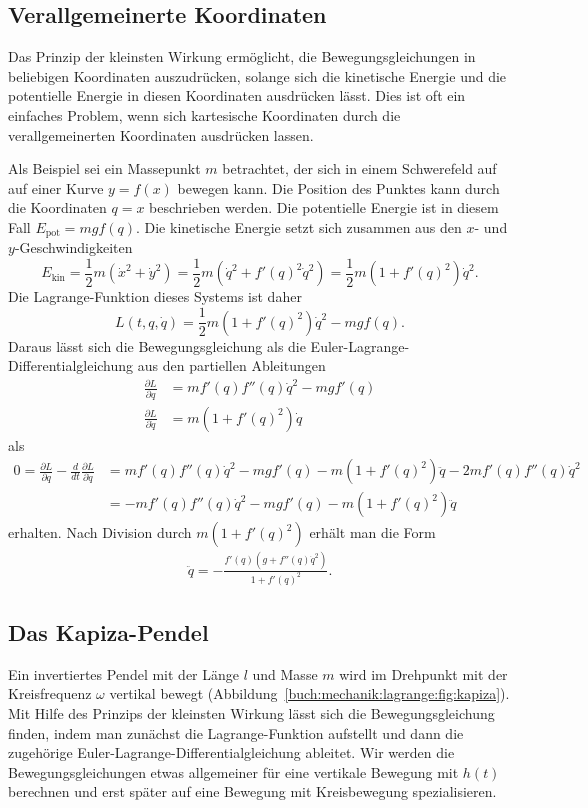 %
%
\subsection{Verallgemeinerte Koordinaten
\label{buch:mechanik:lagrange:subsection:koordinaten}}
Das Prinzip der kleinsten Wirkung ermöglicht, die Bewegungsgleichungen
in beliebigen Koordinaten auszudrücken, solange sich die kinetische
Energie und die potentielle Energie in diesen Koordinaten ausdrücken
lässt.
Dies ist oft ein einfaches Problem, wenn sich kartesische Koordinaten
durch die verallgemeinerten Koordinaten ausdrücken lassen.

Als Beispiel sei ein Massepunkt $m$ betrachtet, der sich in einem
Schwerefeld auf auf einer Kurve $y=f(x)$ bewegen kann.
Die Position des Punktes kann durch die Koordinaten $q=x$ beschrieben
werden.
Die potentielle Energie ist in diesem Fall $E_{\text{pot}} = mgf(q)$.
Die kinetische Energie setzt sich zusammen aus den $x$- und
$y$-Geschwindigkeiten
\[
E_{\text{kin}}
=
\frac12m(\dot{x}^2 + \dot{y}^2)
=
\frac12m(\dot{q}^2 + f'(q)^2 \dot{q}^2)
=
\frac12m(1+f'(q)^2)\dot{q}^2.
\]
Die Lagrange-Funktion dieses Systems ist daher 
\[
L(t,q,\dot{q})
=
\frac12m(1+f'(q)^2)\dot{q}^2 - mgf(q).
\]
Daraus lässt sich die Bewegungsgleichung als die
Euler-Lagrange-Differentialgleichung aus den partiellen Ableitungen
\begin{align*}
\frac{\partial L}{\partial q}
&=
mf'(q)f''(q)\dot{q}^2 - mgf'(q)
\\
\frac{\partial L}{\partial\dot{q}}
&=
m(1+f'(q)^2)\dot{q}
\end{align*}
als
\begin{align*}
0
=
\frac{\partial L}{\partial q}-\frac{d}{dt}\frac{\partial L}{\partial\dot{q}}
&=
mf'(q)f''(q)\dot{q}^2
-
mgf'(q)
-
m(1+f'(q)^2)\ddot{q}
-
2mf'(q)f''(q)\dot{q}^2
\\
&=
-
mf'(q)f''(q)\dot{q}^2
-
mgf'(q)
-
m(1+f'(q)^2)\ddot{q}
\end{align*}
erhalten.
Nach Division durch $m(1+f'(q)^2)$ erhält man die Form
\begin{align*}
\ddot{q}
=
-
\frac{f'(q)(g+f''(q)\dot{q}^2)}{1+f'(q)^2}.
\end{align*}


%
%
\subsection{Das Kapiza-Pendel}

Ein invertiertes Pendel mit der Länge $l$ und Masse $m$ wird im
Drehpunkt mit der Kreisfrequenz $\omega$ vertikal bewegt
(Abbildung~\ref{buch:mechanik:lagrange:fig:kapiza}).
Mit Hilfe des Prinzips der kleinsten Wirkung lässt sich die
Bewegungsgleichung finden, indem man zunächst die Lagrange-Funktion
aufstellt und dann die zugehörige Euler-Lagrange-Differentialgleichung
ableitet.
Wir werden die Bewegungsgleichungen etwas allgemeiner für eine
vertikale Bewegung mit $h(t)$ berechnen und erst später auf eine
Bewegung mit Kreisbewegung spezialisieren.

